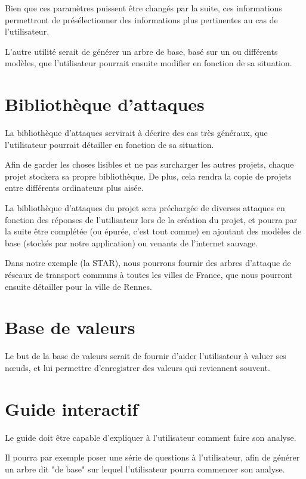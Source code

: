         Bien que ces paramètres puissent être changés par la suite, ces informations permettront de présélectionner des informations plus pertinentes au cas de l'utilisateur.
        
        L'autre utilité serait de générer un arbre de base, basé sur un ou différents modèles, que l'utilisateur pourrait ensuite modifier en fonction de sa situation.
    
    \section{Bibliothèque d'attaques}  
        La bibliothèque d'attaques servirait à décrire des cas très généraux, que l'utilisateur pourrait détailler en fonction de sa situation. 
        
        Afin de garder les choses lisibles et ne pas surcharger les autres projets, chaque projet stockera sa propre bibliothèque. De plus, cela rendra la copie de projets entre différents ordinateurs plus aisée.
        
        La bibliothèque d'attaques du projet sera préchargée de diverses attaques en fonction des réponses de l'utilisateur lors de la création du projet, et pourra par la suite être complétée (ou épurée, c'est tout comme) en ajoutant des modèles de base (stockés par notre application) ou venants de l'internet sauvage.
        
        Dans notre exemple (la STAR), nous pourrons fournir des arbres d'attaque de réseaux de transport communs à toutes les villes de France, que nous pourront ensuite détailler pour la ville de Rennes.
        
    \section{Base de valeurs}
    	Le but de la base de valeurs serait de fournir d'aider l'utilisateur à valuer ses nœuds, et lui permettre d'enregistrer des valeurs qui reviennent souvent.
      
    \section{Guide interactif}
    	Le guide doit être capable d'expliquer à l'utilisateur comment faire son analyse. 
        
        Il pourra par exemple poser une série de questions à l'utilisateur, afin de générer un arbre dit "de base" sur lequel l'utilisateur pourra commencer son analyse.
        
